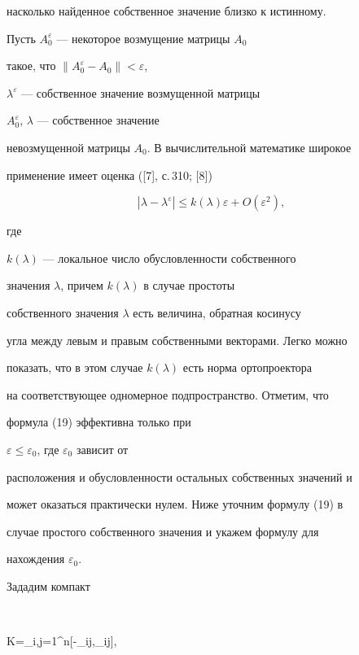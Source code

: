 насколько найденное собственное значение близко к истинному.





Пусть $A_0^\varepsilon$ --- некоторое возмущение матрицы $A_0$


такое, что $\|A_0^\varepsilon-A_0\|<\varepsilon$,


$\lambda^\varepsilon$ --- собственное значение возмущенной матрицы


$A_0^\varepsilon$, $\lambda$ --- собственное значение


невозмущенной матрицы $A_0$. В вычислительной математике широкое


применение имеет оценка ([7], с.\,310; [8])


\begin{equation}


|\lambda-\lambda^\varepsilon|\le


k(\lambda)\varepsilon+O(\varepsilon^2),


\end{equation} 


где


$k(\lambda)$ --- локальное число обусловленности собственного


значения $\lambda$, причем $k(\lambda)$ в случае простоты


собственного значения $\lambda$ есть величина, обратная косинусу


угла между левым и правым собственными векторами. Легко можно


показать, что в этом случае $k(\lambda)$ есть норма ортопроектора


на соответствующее одномерное подпространство. Отметим, что


формула (19) эффективна только при


$\varepsilon\le\varepsilon_0$, где $\varepsilon_0$ зависит от


расположения и обусловленности остальных собственных значений и


может оказаться практически нулем. Ниже уточним формулу (19) в


случае простого собственного значения и укажем формулу для


нахождения $\varepsilon_0$.





Зададим компакт 


$$


K=\prod_{i,j=1}^n[-\delta_{ij},\delta_{ij}],



